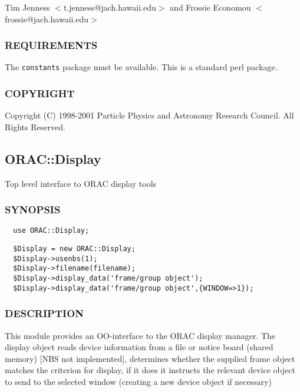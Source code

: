 Tim Jenness $<$t.jenness@jach.hawaii.edu$>$ and
Frossie Economou $<$frossie@jach.hawaii.edu$>$

\subsubsection*{REQUIREMENTS\label{ORAC::Constants_REQUIREMENTS}}


The \texttt{constants} package must be available. This is a standard
perl package.

\subsubsection*{COPYRIGHT\label{ORAC::Constants_COPYRIGHT}}


Copyright (C) 1998-2001 Particle Physics and Astronomy Research
Council. All Rights Reserved.

\subsection{ORAC::Display\label{ORAC::Display}}


Top level interface to ORAC display tools

\subsubsection*{SYNOPSIS\label{ORAC::Display_SYNOPSIS}}
\begin{verbatim}
  use ORAC::Display;
\end{verbatim}
\begin{verbatim}
  $Display = new ORAC::Display;
  $Display->usenbs(1);
  $Display->filename(filename);
  $Display->display_data('frame/group object');
  $Display->display_data('frame/group object',{WINDOW=>1});
\end{verbatim}
\subsubsection*{DESCRIPTION\label{ORAC::Display_DESCRIPTION}}


This module provides an OO-interface to the ORAC display manager.  The
display object reads device information from a file or notice board
(shared memory) [NBS not implemented], determines whether the supplied
frame object matches the criterion for display, if it does it
instructs the relevant device object to send to the selected window
(creating a new device object if necessary)

